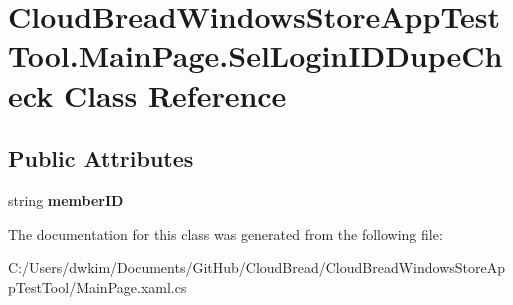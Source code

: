 \hypertarget{class_cloud_bread_windows_store_app_test_tool_1_1_main_page_1_1_sel_login_i_d_dupe_check}{}\section{Cloud\+Bread\+Windows\+Store\+App\+Test\+Tool.\+Main\+Page.\+Sel\+Login\+I\+D\+Dupe\+Check Class Reference}
\label{class_cloud_bread_windows_store_app_test_tool_1_1_main_page_1_1_sel_login_i_d_dupe_check}
\subsection*{Public Attributes}
\begin{DoxyCompactItemize}
\item 
string {\bfseries member\+ID}\hypertarget{class_cloud_bread_windows_store_app_test_tool_1_1_main_page_1_1_sel_login_i_d_dupe_check_a9671b10db758dd484f5ddbbcdd73dcea}{}\label{class_cloud_bread_windows_store_app_test_tool_1_1_main_page_1_1_sel_login_i_d_dupe_check_a9671b10db758dd484f5ddbbcdd73dcea}

\end{DoxyCompactItemize}


The documentation for this class was generated from the following file\+:\begin{DoxyCompactItemize}
\item 
C\+:/\+Users/dwkim/\+Documents/\+Git\+Hub/\+Cloud\+Bread/\+Cloud\+Bread\+Windows\+Store\+App\+Test\+Tool/Main\+Page.\+xaml.\+cs\end{DoxyCompactItemize}
